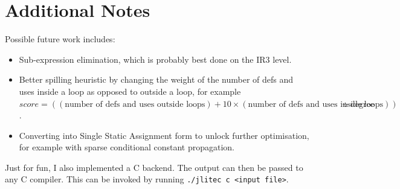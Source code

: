 \documentclass[nonacm, acmsmall, screen, 10pt]{acmart}
\begin{document}
\section{Additional Notes}
Possible future work includes:
\begin{itemize}
  \item Sub-expression elimination, which is probably best done on the IR3 level.
  \item Better spilling heuristic by changing the weight of the number of defs and uses inside a loop as opposed to outside a loop, for example $score = ((\text{number of defs and uses outside loops}) + 10 \times (\text{number of defs and uses inside loops})) \div \text{degree}$.
  \item Converting into Single Static Assignment form to unlock further optimisation, for example with sparse conditional constant propagation.
\end{itemize}

Just for fun, I also implemented a C backend.
The output can then be passed to any C compiler.
This can be invoked by running \texttt{./jlitec c <input file>}.
\end{document}
